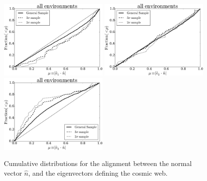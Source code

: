 \documentclass{emulateapj}
\begin{document}
\begin{figure}
\begin{center}
  \includegraphics[width=0.48\textwidth]{alignments_e1_n_all_environments.pdf} 
  \includegraphics[width=0.48\textwidth]{alignments_e2_n_all_environments.pdf} 
  \includegraphics[width=0.48\textwidth]{alignments_e3_n_all_environments.pdf} 
\end{center}
\caption{Cumulative distributions for the alignment between the normal vector
$\hat{n}$, and the eigenvectors defining the cosmic web.
    \label{fig:alignment}}  
\end{figure}
\end{document}
